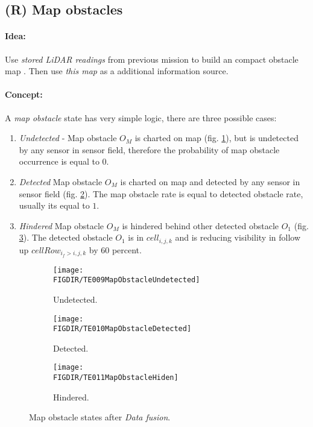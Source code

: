 \subsection{(R) Map obstacles}\label{s:mapObstacles}
\paragraph{Idea:} Use \emph{stored LiDAR readings} from previous mission to build an compact obstacle map \cite{cernamaria2018}. Then use \emph{this map} as a additional information source.

\paragraph{Concept:} A \emph{map obstacle} state has very simple logic, there are three possible cases:

\begin{enumerate}
    \item \emph{Undetected} - Map obstacle $O_M$ is charted on map (fig. \ref{fig:undetectedMapObstalce}), but is undetected by any sensor in sensor field, therefore the probability of map obstacle occurrence is equal to $0$.


    \item \emph{Detected} Map obstacle $O_M$ is charted on map and detected by any sensor in sensor field (fig. \ref{fig:detectedMapObstacle}). The map obstacle rate is equal to detected obstacle rate, usually its equal to $1$.

    \item \emph{Hindered} Map obstacle $O_M$ is hindered behind other detected obstacle $O_1$ (fig. \ref{fig:hinderedMapObstacle}). The detected obstacle $O_1$ is in $cell_{i,j,k}$ and is reducing visibility in follow up $cellRow_{i_f>i,j,k}$ by $60$ percent.
\end{enumerate}

\begin{figure}[H]
    \begin{subfigure}{0.32\textwidth}
        \texttt{[image: \\FIGDIR/TE009MapObstacleUndetected]} 
        \caption{Undetected.}
        \label{fig:undetectedMapObstalce}
    \end{subfigure}
    \begin{subfigure}{0.32\textwidth}
        \texttt{[image: \\FIGDIR/TE010MapObstacleDetected]} 
        \caption{Detected.}
        \label{fig:detectedMapObstacle}
    \end{subfigure}
    \begin{subfigure}{0.32\textwidth}
        \texttt{[image: \\FIGDIR/TE011MapObstacleHiden]}
        \caption{Hindered.}
        \label{fig:hinderedMapObstacle}
    \end{subfigure}
    \caption{Map obstacle states after \emph{Data fusion}.}
    \label{fig:mapObstacleStatesAfterDataFusion}
\end{figure}

